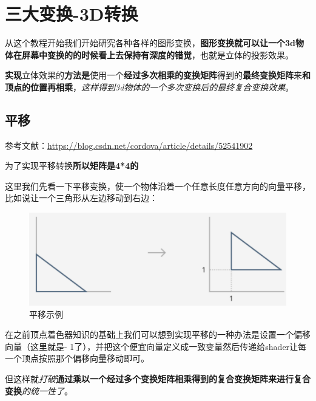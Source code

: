 \documentclass[UTF8,a4paper,12pt]{ctexbook}
\begin{document}
	
	
	
	
\chapter{三大变换-3D转换}
	从这个教程开始我们开始研究各种各样的图形变换，\textbf{图形变换就可以让一个3d物体在屏幕中变换的的时候看上去保持有深度的错觉}，也就是立体的投影效果。
	
	\textbf{实现}立体效果的\textbf{方法是}使用一个\textbf{经过多次相乘的变换矩阵}得到的\textbf{最终变换矩阵}来\textbf{和顶点的位置再相乘}，\textit{这样得到3d物体的一个多次变换后的最终复合变换效果}。
	
	\section{平移}
		参考文献：\url{https://blog.csdn.net/cordova/article/details/52541902}
		
		为了实现平移转换\textbf{所以矩阵是4*4的}
		
		
		这里我们先看一下平移变换，使一个物体沿着一个任意长度任意方向的向量平移，比如说让一个三角形从左边移动到右边：
			\begin{figure}[H]
				\centering
				\includegraphics[width=.7\linewidth]{transfer.png}
				\caption{平移示例}
			\end{figure}

		在之前顶点着色器知识的基础上我们可以想到实现平移的一种办法是设置一个偏移向量（这里就是- 1了），并把这个便宜向量定义成一致变量然后传递给shader让每一个顶点按照那个偏移向量移动即可。
		
		但这样就\textit{打破}\textbf{通过乘以一个经过多个变换矩阵相乘得到的复合变换矩阵来进行复合变换}\textit{的统一性了}。
		 
\end{document}
